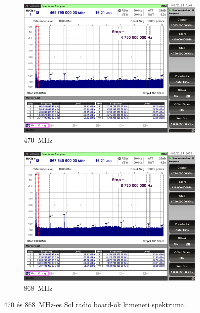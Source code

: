 \documentclass[a4paper,12pt,titlepage]{article}
\begin{document}
            \begin{figure}
                \centering
                \begin{subfigure}{0.48\textwidth}
                    \includegraphics[width=\textwidth]{kep/szerkesztett/sol-470-conducted.png}
                    \caption{\SI{470}{MHz}}
                \end{subfigure}
                \begin{subfigure}{0.48\textwidth}
                    \includegraphics[width=\textwidth]{kep/szerkesztett/sol-868-conducted.png}
                    \caption{\SI{868}{MHz}}
                \end{subfigure}
                \caption{470 és \SI{868}{MHz}-es Sol radio board-ok kimeneti spektruma.}
                \label{fig:sol-conducted}
            \end{figure}
%
\end{document}
